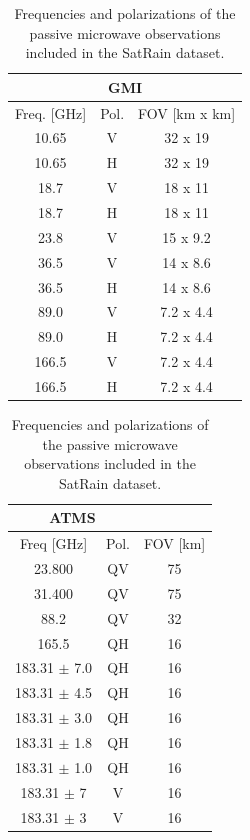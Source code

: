 \documentclass[11pt]{article}
\begin{document}
\begin{table}[htbp]
	\centering
	\begin{subtable}{0.45\textwidth}
		\centering
		\begin{tabular}{ccc}
			\multicolumn{3}{c}{GMI}            \\[0.5ex]
			\toprule
			Freq. [GHz] & Pol. & FOV [km x km] \\
			\midrule
			10.65       & V    & 32 x 19       \\
			10.65       & H    & 32 x 19       \\
			18.7        & V    & 18 x 11       \\
			18.7        & H    & 18 x 11       \\
			23.8        & V    & 15 x 9.2      \\
			36.5        & V    & 14 x 8.6      \\
			36.5        & H    & 14 x 8.6      \\
			89.0        & V    & 7.2 x 4.4     \\
			89.0        & H    & 7.2 x 4.4     \\
			166.5       & V    & 7.2 x 4.4     \\
			166.5       & H    & 7.2 x 4.4     \\
			\bottomrule
		\end{tabular}
		\caption{Channel frequencies and polarizations of the GMI sensor included in the SatRain dataset.}
		\label{tab:left}
	\end{subtable}%
	\hfill%
	\begin{subtable}{0.45\textwidth}
		\centering
		\begin{tabular}{ccc}
			\multicolumn{2}{c}{ATMS}           \\[0.5ex]
			\toprule
			Freq [GHz]       & Pol. & FOV [km] \\
			\midrule
			23.800           & QV   & 75       \\
			31.400           & QV   & 75       \\
			88.2             & QV   & 32       \\
			165.5            & QH   & 16       \\
			183.31 $\pm$ 7.0 & QH   & 16       \\
			183.31 $\pm$ 4.5 & QH   & 16       \\
			183.31 $\pm$ 3.0 & QH   & 16       \\
			183.31 $\pm$ 1.8 & QH   & 16       \\
			183.31 $\pm$ 1.0 & QH   & 16       \\
			183.31 $\pm$ 7   & V    & 16       \\
			183.31 $\pm$ 3   & V    & 16       \\
			\bottomrule
		\end{tabular}
		\caption{Channel frequencies and polarizations of the ATMS sensor included in the SatRain dataset.}
		\label{tab:right}
	\end{subtable}
	\caption{Frequencies and polarizations of the passive microwave observations included in the SatRain dataset.}
	\label{tab:both}
\end{table}
\end{document}
